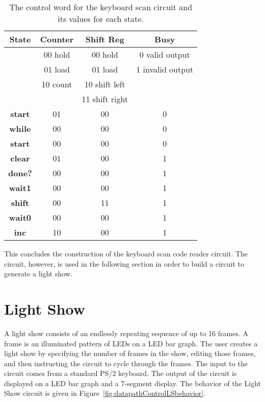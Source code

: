 \begin{table}
    \begin{tabular}{c||c|c|c}
        \textbf{ State }  & Counter    & Shift Reg    &  Busy          \\ \hline
        & 00 hold    & 00 hold    & 0 valid output    \\ \hline
        & 01 load    & 01 load    & 1 invalid output    \\ \hline
        & 10 count    & 10 shift left    &             \\ \hline
        &              & 11 shift right&            \\ \hline \hline
        \textbf{ start }    &    01    &    00    &    0    \\ \hline
        \textbf{ while }    &    00    &    00    &    0    \\ \hline
        \textbf{ start }    &    00    &    00    &    0    \\ \hline
        \textbf{ clear }    &    01    &    00    &    1    \\ \hline
        \textbf{ done? }    &    00    &    00    &    1    \\ \hline
        \textbf{ wait1 }    &    00    &    00    &    1    \\ \hline
        \textbf{ shift }    &    00    &    11    &    1    \\ \hline
        \textbf{ wait0 }    &    00    &    00    &    1    \\ \hline
        \textbf{ inc }    &    10    &    00    &    1    \\
    \end{tabular}
    \caption{The control word for the keyboard scan circuit and its values for each state.}
    \label{table:kscan}
\end{table}

This concludes the construction of the keyboard scan code reader circuit.
The circuit, however, is used in the following section in order to build a
circuit to generate a light show.


\pagebreak
\section{Light Show}

A light show consists of an endlessly repeating sequence of up to 16 frames.
A frame is an illuminated pattern of LEDs on a LED bar graph. The user
creates a light show by specifying the number of frames in the show, editing
those frames, and then instructing the circuit to cycle through the frames.
The input to the circuit comes from a standard PS/2 keyboard. The output of
the circuit is displayed on a LED bar graph and a 7-segment display. The
behavior of the Light Show circuit is given in Figure~\ref{fig:datapathControlLSbehavior}.


